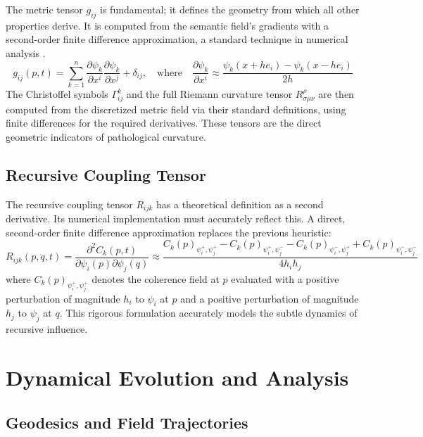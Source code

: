 The metric tensor \(g_{ij}\) is fundamental; it defines the geometry from which all other properties derive. It is computed from the semantic field's gradients with a second-order finite difference approximation, a standard technique in numerical analysis \autocite{BurdenFairesBurden2015}.
\begin{equation}
g_{ij}(p,t) = \sum_{k=1}^n \frac{\partial \psi_k}{\partial x^i} \frac{\partial \psi_k}{\partial x^j} + \delta_{ij}, \quad \text{where} \quad \frac{\partial \psi_k}{\partial x^i} \approx \frac{\psi_k(x + h e_i) - \psi_k(x - h e_i)}{2h}
\end{equation}
The Christoffel symbols \(\Gamma^k_{ij}\) and the full Riemann curvature tensor \(R^{\rho}_{\sigma\mu\nu}\) are then computed from the discretized metric field via their standard definitions, using finite differences for the required derivatives. These tensors are the direct geometric indicators of pathological curvature.

\subsection{Recursive Coupling Tensor}

The recursive coupling tensor \(R_{ijk}\) has a theoretical definition as a second derivative. Its numerical implementation must accurately reflect this. A direct, second-order finite difference approximation replaces the previous heuristic:
\begin{equation}
R_{ijk}(p,q,t) = \frac{\partial^2 C_k(p,t)}{\partial \psi_i(p) \partial \psi_j(q)} \approx \frac{C_k(p)_{\psi_i^+,\psi_j^+} - C_k(p)_{\psi_i^+,\psi_j^-} - C_k(p)_{\psi_i^-,\psi_j^+} + C_k(p)_{\psi_i^-,\psi_j^-}}{4h_i h_j}
\end{equation}
where \(C_k(p)_{\psi_i^+,\psi_j^+}\) denotes the coherence field at \(p\) evaluated with a positive perturbation of magnitude \(h_i\) to \(\psi_i\) at \(p\) and a positive perturbation of magnitude \(h_j\) to \(\psi_j\) at \(q\). This rigorous formulation accurately models the subtle dynamics of recursive influence.

\section{Dynamical Evolution and Analysis}

\subsection{Geodesics and Field Trajectories}

